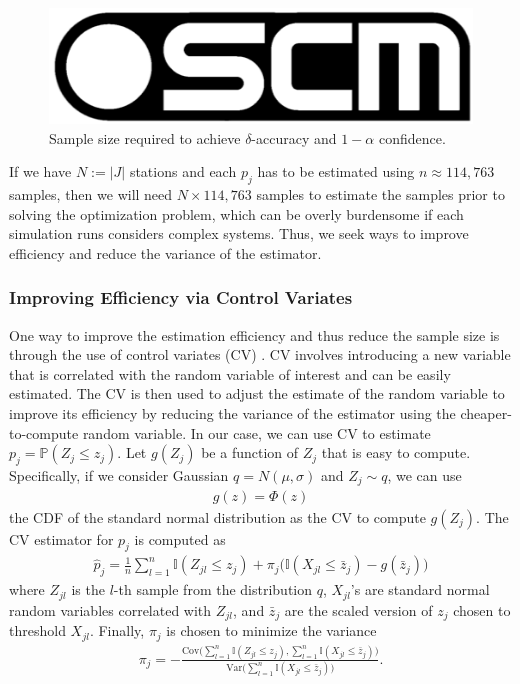 \documentclass[preprint]{oscmjournal}
\theoremstyle{remark}
\begin{document}
\begin{figure}
    \centering
    \includegraphics[width=0.5\linewidth]{figs/oscm.png}
    \caption{Sample size required to achieve $\delta$-accuracy and $1-\alpha$ confidence.}
    \label{fig:sample_size}
\end{figure}

If we have $N := |J|$ stations and each $p_j$ has to be estimated using $n\approx 114,763$ samples, then we will need $N \times 114,763$ samples to estimate the samples prior to solving the optimization problem, which can be overly burdensome if each simulation runs considers complex systems. Thus, we seek ways to improve efficiency and reduce the variance of the estimator.


\subsubsection{Improving Efficiency via Control Variates}

One way to improve the estimation efficiency and thus reduce the sample size is through the use of control variates (CV) \autocite{hesterberg1998control}. CV involves introducing a new variable that is correlated with the random variable of interest and can be easily estimated. The CV is then used to adjust the estimate of the random variable to improve its efficiency by reducing the variance of the estimator using the cheaper-to-compute random variable. In our case, we can use CV to estimate $p_j = \mathbb P(Z_j \leq z_j)$. Let $g(Z_j)$ be a function of $Z_j$ that is easy to compute. Specifically, if we consider Gaussian $q = N(\mu, \sigma)$ and $Z_j \sim q$, we can use 
\begin{align}
g(z) = \Phi(z)
\end{align}
the CDF of the standard normal distribution as the CV to compute $g(Z_j)$.  The CV estimator for $p_j$ is computed as
\begin{align}
\hat p_j = \frac{1}{n}\sum_{l=1}^n \mathbb I(Z_{jl} \leq z_j) + \pi_j \bigg( \mathbb I (X_{jl}\leq \bar z_j)-g(\bar z_j) \bigg)
\label{cv_estimator}
\end{align}
where $Z_{jl}$ is the $l$-th sample from the distribution $q$, $X_{jl}$'s are standard normal random variables  correlated with $Z_{jl}$, and $\bar z_j$ are the scaled version of $z_j$ chosen to threshold $X_{jl}$. Finally, $\pi_j$ is chosen to minimize the variance
\begin{align}
\pi_j = - \frac{\text{Cov}\bigg( \sum_{l=1}^n \mathbb I(Z_{jl}\leq z_j), \sum_{l=1}^n \mathbb I(X_{jl}\leq \bar z_j) \bigg)}{\text{Var}\bigg(\sum_{l=1}^n \mathbb I(X_{jl}\leq \bar z_j)\bigg)}. 
\label{opt_cj}
\end{align}
\end{document}
